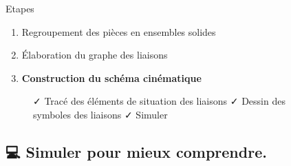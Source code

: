 \documentclass[
  ignorenonframetext,
  aspectratio=169,
  c]{beamer}
\providecommand{\tightlist}{%
  \setlength{\itemsep}{0pt}\setlength{\parskip}{0pt}}\usepackage{longtable,booktabs,array}
\begin{document}
\begin{frame}{Etapes}
\label{etapes-7}
\begin{enumerate}
\tightlist
\item
  {Regroupement des pièces en ensembles solides}
\item
  {Élaboration du graphe des liaisons}
\item
  \textbf{Construction du schéma cinématique}
\end{enumerate}

\begin{figure}

\begin{minipage}{0.80\linewidth}
{✓ Tracé des éléments de situation des liaisons} {✓ Dessin des symboles
des liaisons} ✓ Simuler\end{minipage}%

\end{figure}%
\end{frame}

\subsection{💻 Simuler pour mieux
comprendre.}\label{simuler-pour-mieux-comprendre.}
\end{document}
